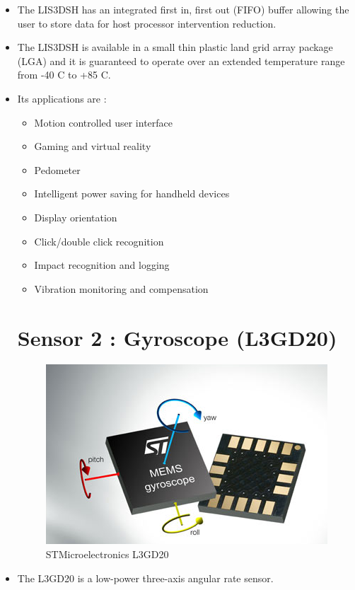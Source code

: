 \documentclass[11pt,a4paper]{article}
\begin{document}
\begin{itemize}
\item The LIS3DSH has an integrated first in, first out
(FIFO) buffer allowing the user to store data for
host processor intervention reduction.

\item The LIS3DSH is available in a small thin plastic
land grid array package (LGA) and it is
guaranteed to operate over an extended
temperature range from -40 C to +85 C.

\item Its applications are :
\begin{itemize}
\item Motion controlled user interface
\item Gaming and virtual reality
\item Pedometer
\item Intelligent power saving for handheld devices
\item Display orientation
\item Click/double click recognition
\item Impact recognition and logging
\item Vibration monitoring and compensation

\end{itemize}

\newpage
\section{Sensor 2 : Gyroscope (L3GD20)}

\begin{figure}[h]
    \centering
	\includegraphics[scale=0.5]{gyroscope.png}
	\caption {STMicroelectronics L3GD20}
	\end{figure}

\item The L3GD20 is a low-power three-axis angular
rate sensor.


\end{itemize}
\end{document}

